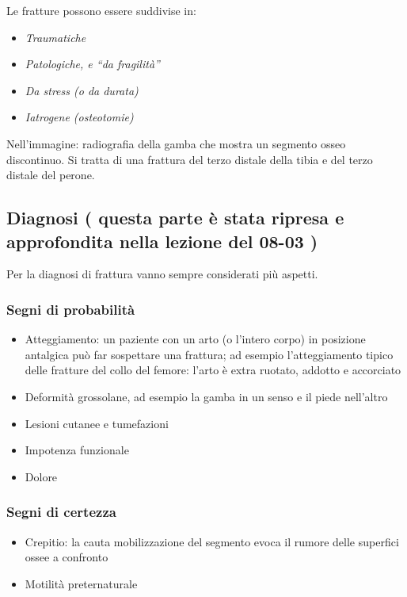 Le fratture possono essere suddivise in:
\begin{itemize}
\item
  \emph{Traumatiche}
\item
  \emph{Patologiche, e ``da fragilità''}
\item
  \emph{Da stress (o da durata)}
\item
  \emph{Iatrogene (osteotomie)}
\end{itemize}



Nell'immagine: radiografia della gamba che mostra un segmento osseo discontinuo. Si tratta di una frattura del terzo distale della tibia e del terzo distale del perone.


\subsection{Diagnosi ( questa parte è stata ripresa e approfondita nella lezione del
08-03 )}

Per la diagnosi di frattura vanno sempre considerati più aspetti.

\subsubsection{Segni di probabilità}

\begin{itemize}
\item
  Atteggiamento: un paziente con un arto (o l'intero corpo) in posizione antalgica può far sospettare una frattura; ad esempio l'atteggiamento tipico delle fratture del collo del femore: l'arto è extra ruotato, addotto e accorciato
\item
Deformità grossolane, ad esempio la gamba in un senso e il piede nell'altro
\item
Lesioni cutanee e tumefazioni
\item
 Impotenza funzionale
\item
 Dolore
\end{itemize}

\subsubsection{Segni di certezza}

\begin{itemize}
\item
 Crepitio: la cauta mobilizzazione del segmento evoca il rumore delle superfici ossee a confronto
\item
 Motilità preternaturale
\end{itemize}


